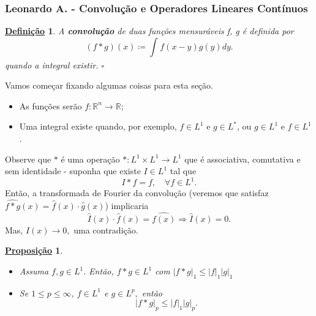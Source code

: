 \documentclass{article}
\newtheorem*{def*}{\underline{Defini\c c\~ao}}
\newtheorem*{prop*}{\underline{Proposi\c c\~ao}}
\begin{document}
\subsubsection*{Leonardo A. - Convolução e Operadores Lineares Contínuos}
  \begin{def*}
    A \textbf{convolução} de duas funções mensuráveis f, g é definida por 
      \[
        (f*g)(x)\coloneqq \int_{}^{}f(x-y)g(y)dy.
      \]
    quando a integral existir. \(\square\)
  \end{def*}
  Vamos começar fixando algumas coisas para esta seção. 
 \begin{itemize}
   \item As funções serão \(f:\mathbb{R}^{n}\rightarrow \mathbb{R}\);
   \item Uma integral existe quando, por exemplo, \(f\in L^{1} \text{ e } g\in L^{*}\), ou \(g\in L^{1}\text{ e }f\in L^{1}\).
 \end{itemize}
  Observe que \(*\) é uma operação \(*:L^{1}\times L^{1}\rightarrow L^{1}\) que é associativa, comutativa e sem identidade - suponha que existe \(I\in L^{1}\) tal que 
    \[
      I*f = f,\quad \forall f\in L^{1}.
    \]
  Então, a transformada de Fourier da convolução (veremos que satisfaz \(\widehat{f*g}(x) = \hat{f}(x)\cdot \hat{g}(x)\)) implicaria 
    \[
      \hat{I}(x)\cdot \hat{f}(x) = \hat{f(x)} \Rightarrow \hat{I}(x) = 0.
    \]
    Mas, \(\hat{I}(x)\to 0,\) uma contradição.
   \begin{prop*}
    \begin{itemize}
      \item[1)]Assuma \(f, g\in L^{1}.\) Então,  \(f*g\in L^{1}\) com \(|f*g|_1\leq |f|_1|g|_1\)
        \item[2)] Se \(1\leq p\leq \infty\), \(f\in L^{1}\) e \(g\in L^{p},\) então 
          \[
            |f*g|_p \leq |f|_1|g|_p.
          \]
    \end{itemize}
   \end{prop*}
\end{document}
